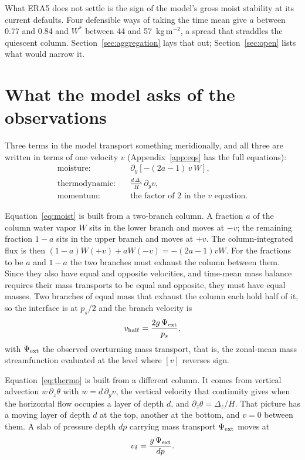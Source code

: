 \documentclass[11pt]{article}
\newcommand{\py}{\partial_y}
\newcommand{\Wstar}{W^*}
\newcommand{\vhalf}{v_{\rm half}}
\newcommand{\vslab}{v_{\delta}}
\begin{document}
What ERA5 does not settle is the sign of the model's gross moist stability at
its current defaults. Four defensible ways of taking the time mean give
$a$ between 0.77 and 0.84 and $\Wstar$ between 44 and 57~kg\,m$^{-2}$, a spread
that straddles the quiescent column. Section~\ref{sec:aggregation} lays that
out; Section~\ref{sec:open} lists what would narrow it.

\section{What the model asks of the observations}
\label{sec:ask}

Three terms in the model transport something meridionally, and all three are
written in terms of one velocity $v$ (Appendix~\ref{app:eqs} has the full
equations):
%
\begin{align}
\text{moisture:} &\quad \py\!\left[-(2a-1)\,v\,W\right],
\label{eq:moist}\\
\text{thermodynamic:} &\quad \frac{d\,\Delta_z}{H}\,\py v,
\label{eq:thermo}\\
\text{momentum:} &\quad \text{the factor of 2 in the $v$ equation.}
\label{eq:mom}
\end{align}

Equation~\eqref{eq:moist} is built from a two-branch column. A fraction $a$ of
the column water vapor $W$ sits in the lower branch and moves at $-v$; the
remaining fraction $1-a$ sits in the upper branch and moves at $+v$. The
column-integrated flux is then
$(1-a)W(+v) + aW(-v) = -(2a-1)vW$. For the fractions to be $a$ and $1-a$ the
two branches must exhaust the column between them. Since they also have equal
and opposite velocities, and time-mean mass balance requires their mass
transports to be equal and opposite, they must have equal masses. Two branches
of equal mass that exhaust the column each hold half of it, so the interface is
at $p_s/2$ and the branch velocity is
%
\begin{equation}
\vhalf = \frac{2g\,\Psi_{\rm ext}}{p_s},
\label{eq:vhalf}
\end{equation}
%
with $\Psi_{\rm ext}$ the observed overturning mass transport, that is, the
zonal-mean mass streamfunction evaluated at the level where $[v]$ reverses
sign.

Equation~\eqref{eq:thermo} is built from a different column. It comes from
vertical advection $w\,\partial_z\theta$ with $w = d\,\py v$, the vertical
velocity that continuity gives when the horizontal flow occupies a layer of
depth $d$, and $\partial_z\theta = \Delta_z/H$. That picture has a moving layer
of depth $d$ at the top, another at the bottom, and $v=0$ between them. A slab
of pressure depth $dp$ carrying mass transport $\Psi_{\rm ext}$ moves at
%
\begin{equation}
\vslab = \frac{g\,\Psi_{\rm ext}}{dp}.
\label{eq:vslab}
\end{equation}
\end{document}
